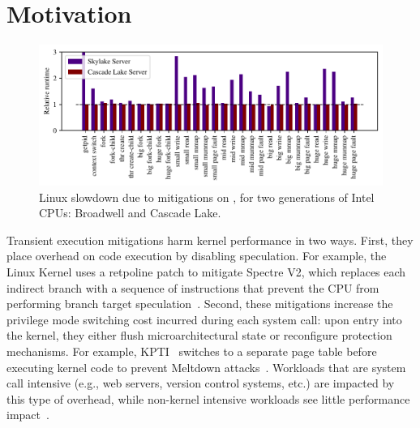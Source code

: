 \section{Motivation}
\label{s:motivation}

\begin{figure}[t]
  \begin{center}
    \includegraphics{results/bhw2_bhw3_overhead}
  \end{center}
\vspace{-\baselineskip}
\caption{Linux slowdown due to mitigations on \bench, for two generations of Intel CPUs: Broadwell and Cascade Lake.}
\label{fig:linuxslowdown}
\end{figure}


Transient execution mitigations harm kernel performance in two
ways. First, they place overhead on code execution by disabling
speculation.  For example, the Linux Kernel uses a retpoline patch to
mitigate Spectre V2, which replaces each indirect branch with a
sequence of instructions that prevent the CPU from performing branch
target speculation~\cite{intel:retpoline}. Second, these mitigations
increase the privilege mode switching cost incurred during each system
call: upon entry into the kernel, they either flush microarchitectural
state or reconfigure protection mechanisms.  For example,
KPTI~\cite{gruss:kaiser,linux:kpti} switches to a separate page table
before executing kernel code to prevent Meltdown
attacks~\cite{lipp:meltdown}.  Workloads
that are system call intensive (e.g., web servers, version control
systems, etc.) are impacted by this type of overhead, while non-kernel
intensive workloads see little performance impact~\cite{gruss:kaiser}.

